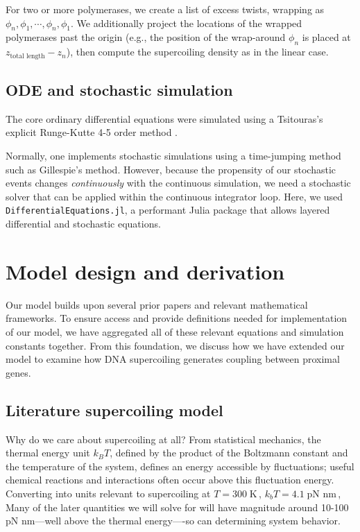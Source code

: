 \documentclass[11pt]{article}
\newcommand{\unit}[1]{\; \text{#1}\,}
\begin{document}
For two or more polymerases, we create a list of excess twists, wrapping as \(\phi_{n}, \phi_1, \cdots, \phi_n, \phi_1\). We additionally project the locations of the wrapped polymerases past the origin (e.g., the position of the wrap-around \(\phi_n\) is placed at \(z_\text{total length} - z_n\)), then compute the supercoiling density as in the linear case.

\subsection{ODE and stochastic simulation}
The core ordinary differential equations were simulated using a Tsitouras's explicit Runge-Kutte 4-5 order method \parencite{tsitourasRungeKuttaPairs2011}.

Normally, one implements stochastic simulations using a time-jumping method such as Gillespie's method. However, because the propensity of our stochastic events changes \emph{continuously} with the continuous simulation, we need a stochastic solver that can be applied within the continuous integrator loop. Here, we used \texttt{DifferentialEquations.jl}, a performant Julia package that allows layered differential and stochastic equations.
\parencite{rackauckasDifferentialEquationsJlPerformant2017}



\section{Model design and derivation}
\label{sec:appendix:model}
Our model builds upon several prior papers and relevant mathematical frameworks. To ensure access and provide definitions needed for implementation of our model, we have aggregated all of these relevant equations and simulation constants together. From this foundation, we discuss how we have extended our model to examine how DNA supercoiling generates coupling between proximal genes.

\subsection{Literature supercoiling model}
Why do we care about supercoiling at all? From statistical mechanics, the thermal energy unit \(k_B T\), defined by the product of the Boltzmann constant and the temperature of the system, defines an energy accessible by fluctuations; useful chemical reactions and interactions often occur above this fluctuation energy. Converting into units relevant to supercoiling at \(T = 300 \unit{K}\), \(k_b T = 4.1 \unit{pN nm}\),  Many of the later quantities we will solve for will have magnitude around 10-100 pN nm---well above the thermal energy----so can determining system behavior.
\end{document}
